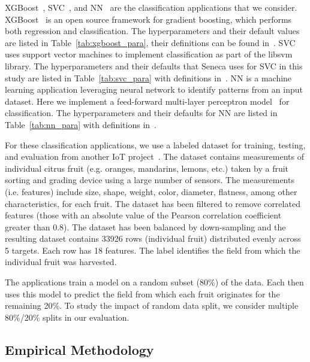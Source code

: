XGBoost~\cite{ref:xgboost-web}, SVC~\cite{ref:svc}, and NN~\cite{ref:neural_network} 
are the classification applications that we consider.
XGBoost~\cite{ref:xgboost-web} is an open source 
framework for gradient boosting, which 
performs both regression and classification. 
The hyperparameters and their default values 
are listed in Table~\ref{tab:xgboost_para}, their definitions can be
found in~\cite{ref:xgboostparams}. SVC uses support vector machines to implement classification as part of the libsvm~\cite{ref:libsvm} library.
The hyperparameters and their defaults that Seneca uses for SVC in this study are listed in Table~\ref{tab:svc_para} with definitions
in~\cite{ref:svcparams}. NN is a machine 
learning application leveraging neural network to identify patterns from an input dataset. 
Here we implement a feed-forward multi-layer perceptron model~\cite{ref:feedforward_nn} 
for classification. The hyperparameters and their defaults for NN are listed in Table~\ref{tab:nn_para} with definitions
in~\cite{ref:nnparams}. 

For these classification applications, we use a labeled
dataset for training, testing, and evaluation from another IoT 
project~\cite{blind}. The dataset contains measurements of individual
citrus fruit (e.g. oranges, mandarins, lemons, etc.) taken by a fruit sorting
and grading device using a large number of sensors. The measurements (i.e. features) include size, shape, weight, color, diameter, flatness, among other characteristics, for each fruit.  
The dataset has been filtered to remove correlated
features (those with an absolute value of the Pearson correlation coefficient
greater than 0.8). The dataset has been balanced by 
down-sampling and the resulting 
dataset contains 33926 rows (individual fruit) 
distributed evenly across 5 targets. Each row has
18 features.  The label identifies the field from which the individual fruit was harvested.

The applications train a model on a random subset (80\%) of the data. Each then uses this model to predict the field from which each fruit originates for the remaining 20\%. To study the impact of random data split, we consider multiple 80\%/20\% splits in our evaluation.
\subsection{Empirical Methodology}

